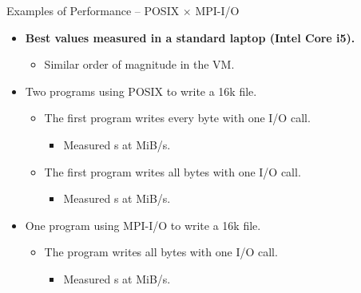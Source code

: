 \documentclass[compress,11pt,xcolor=svgnames,aspectratio=169]{beamer}
\begin{document}
\begin{frame}[fragile]{Examples of Performance -- POSIX $\times$ MPI-I/O}

\begin{itemize}
\setlength\itemsep{0.4cm}

\item \textbf{Best values measured in a standard laptop (Intel Core i5).}
  \begin{itemize}
    \item Similar order of magnitude in the VM.
  \end{itemize}

\item Two programs using POSIX to write a 16k file.

  \begin{itemize}
  \setlength\itemsep{0.2cm}

    \item The first program writes every byte with one I/O call.
    \begin{itemize}
      \item Measured s at  MiB/s.
    \end{itemize}

    \item The first program writes all bytes with one I/O call.
    \begin{itemize}
      \item Measured s at  MiB/s.
    \end{itemize}

  \end{itemize}

\item One program using MPI-I/O to write a 16k file.

  \begin{itemize}

  \item The program writes all bytes with one I/O call.
  \begin{itemize}
    \item Measured s at  MiB/s.
  \end{itemize}

  \end{itemize}

\end{itemize}

\end{frame}
\end{document}
